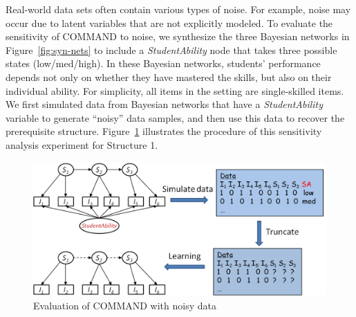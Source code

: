\documentclass{edm_template}
\newcommand{\hl}[1]{\colorbox{yellow}{#1}}
\begin{document}
	Real-world data sets often contain various types of noise.
	For example,  noise may occur due to latent variables that are not explicitly modeled. 
	To evaluate the sensitivity of COMMAND to noise, we synthesize the three Bayesian networks in Figure~\ref{fig:syn-nets} to include a \emph{StudentAbility} node 
	that takes three possible states (low/med/high). 
	In these Bayesian networks, students' performance depends not only on whether they have mastered the skills, but also on their individual ability. %
	For simplicity, all items in the setting are single-skilled items. 
	We first simulated data from  Bayesian networks that have a \emph{StudentAbility} variable to generate ``noisy'' data samples, and 
	then use this data to recover the prerequisite structure. %
	Figure~\ref{fig:stuabilitymodel} illustrates the procedure of this sensitivity analysis experiment for Structure 1.
	
			\begin{figure}[ht]
				\begin{center}
					\includegraphics[width=.95\linewidth]{figures/studentability.png}
				\end{center}
				\vspace{-1em}
				\caption{Evaluation of COMMAND with noisy data} 
				\label{fig:stuabilitymodel}
			\end{figure}
			
\end{document}
